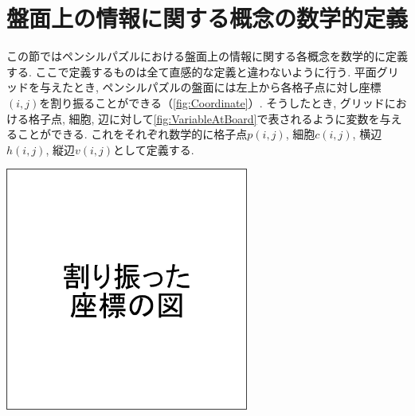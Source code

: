 \section{盤面上の情報に関する概念の数学的定義}\label{section:MathematicalDefinition}
この節ではペンシルパズルにおける盤面上の情報に関する各概念を数学的に定義する. ここで定義するものは全て直感的な定義と違わないように行う.
平面グリッドを与えたとき, ペンシルパズルの盤面には左上から各格子点に対し座標$(i,j)$を割り振ることができる（\cref{fig:Coordinate}）. そうしたとき, グリッドにおける格子点, 細胞, 辺に対して\cref{fig:VariableAtBoard}で表されるように変数を与えることができる.
これをそれぞれ数学的に格子点$p(i,j)$, 細胞$c(i,j)$, 横辺$h(i,j)$, 縦辺$v(i,j)$として定義する.

\begin{clearpagefigure}
  \includegraphics[width=8cm,clip]{fig/coordinate.png}
  \caption{}
  \label{fig:Coordinate}
\end{clearpagefigure}

